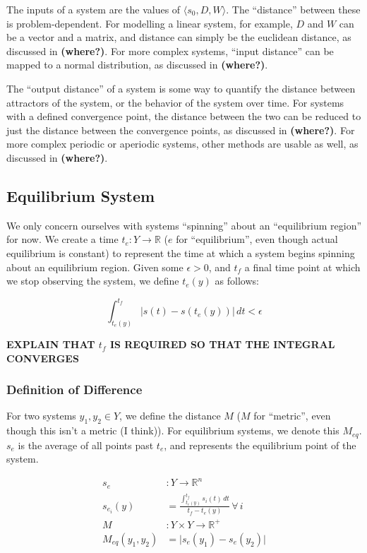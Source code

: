 \documentclass{article}
\begin{document}
The inputs of a system are the values of $\langle s_0, D, W \rangle$. The ``distance'' between these is problem-dependent. For modelling a linear system, for example, $D$ and $W$ can be a vector and a matrix, and distance can simply be the euclidean distance, as discussed in \textbf{(where?)}. For more complex systems, ``input distance'' can be mapped to a normal distribution, as discussed in \textbf{(where?)}.

The ``output distance'' of a system is some way to quantify the distance between attractors of the system, or the behavior of the system over time. For systems with a defined convergence point, the distance between the two can be reduced to just the distance between the convergence points, as discussed in \textbf{(where?)}. For more complex periodic or aperiodic systems, other methods are usable as well, as discussed in \textbf{(where?)}.

\subsection{Equilibrium System}
We only concern ourselves with systems ``spinning'' about an ``equilibrium region'' for now. We create a time  $t_e :  Y \to \mathbb{R}$ ($e$ for ``equilibrium'', even though actual equilibrium is constant) to represent the time at which a system begins spinning about an equilibrium region.
Given some $\epsilon > 0$, and $t_f$ a final time point at which we stop observing the system, we define $t_e(y)$ as follows:

\begin{equation}
  \int_{t_e(y)}^{t_f} \lvert s(t) - s(t_e(y)) \rvert\, dt < \epsilon \label{t_e}
\end{equation}

\textbf{EXPLAIN THAT $t_f$ IS REQUIRED SO THAT THE INTEGRAL CONVERGES}

\subsubsection{Definition of Difference}
For two systems $y_1, y_2 \in Y$, we define the distance $M$ ($M$ for ``metric'', even though this isn't a metric (I think)). For equilibrium systems, we denote this $M_{eq}$. $s_e$ is the average of all points past $t_e$, and represents the equilibrium point of the system.

\begin{align}
  s_e &: Y \to \mathbb{R}^n \\
  s_{e_i}(y) &= \frac{\int_{t_e(y)}^{t_f} s_i(t) \,dt}{t_f - t_e(y)} \,\forall\, i \\
  M &: Y \times Y \to \mathbb{R}^+ \\
  M_{eq}(y_1, y_2) &= \lvert s_e(y_1) - s_e(y_2) \rvert \label{distance}
\end{align}
\end{document}
